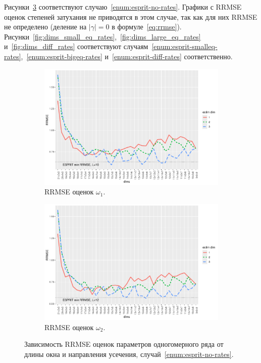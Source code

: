 \documentclass[specialist,
  substylefile=spbu_report.rtx,
subf,href,colorlinks=true, 12pt]{disser}
\theoremstyle{plain}
\theoremstyle{definition}
\theoremstyle{remark}
\begin{document}
Рисунки~\ref{fig:dims_no_rates} соответствуют
случаю~\ref{enum:esprit-no-rates}.
Графики с RRMSE оценок степеней затухания не приводятся в этом
случае, так как для них RRMSE не определено (деление на $|\gamma|=0$ в
формуле~\eqref{eq:rrmse}).
Рисунки~\ref{fig:dims_small_eq_rates},~\ref{fig:dims_large_eq_rates}
и~\ref{fig:dims_diff_rates}
соответствуют
случаям~\ref{enum:esprit-smalleq-rates},~\ref{enum:esprit-bigeq-rates}
и~\ref{enum:esprit-diff-rates}
соответственно.
\begin{figure}[!ht]
  \centering
  \begin{subfigure}{0.49\linewidth}
    \includegraphics[width=\linewidth]{freq1_dims_no_rates.pdf}
    \caption{RRMSE оценок $\omega_1$.}
    \label{fig:freq1_dims_no_rates}
  \end{subfigure}
  \begin{subfigure}{0.49\linewidth}
    \includegraphics[width=\linewidth]{freq2_dims_no_rates.pdf}
    \caption{RRMSE оценок $\omega_2$.}
    \label{fig:freq2_dims_no_rates}
  \end{subfigure}
  \caption{Зависимость RRMSE оценок параметров одногомерного ряда
    от длины окна и направления усечения,
  случай~\ref{enum:esprit-no-rates}.}
  \label{fig:dims_no_rates}
\end{figure}
\end{document}
